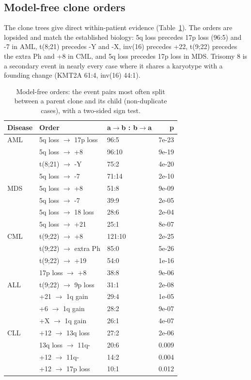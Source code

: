 \documentclass[conference]{IEEEtran}
\begin{document}
\subsection{Model-free clone orders}
The clone trees give direct within-patient evidence (Table~\ref{tab:cloneorders}). The orders are lopsided and match the established biology: 5q loss precedes 17p loss (96:5) and -7 in AML, t(8;21) precedes -Y and -X, inv(16) precedes +22, t(9;22) precedes the extra Ph and +8 in CML, and 5q loss precedes 17p loss in MDS. Trisomy 8 is a secondary event in nearly every case where it shares a karyotype with a founding change (KMT2A 61:4, inv(16) 44:1).

\begin{table}[!t]
\centering
\caption{Model-free orders: the event pairs most often split between a parent clone and its child (non-duplicate cases), with a two-sided sign test.}
\label{tab:cloneorders}
\footnotesize
\setlength{\tabcolsep}{3pt}
\begin{tabular}{lllr}
\toprule
\textbf{Disease} & \textbf{Order} & \textbf{a$\rightarrow$b : b$\rightarrow$a} & \textbf{p} \\
\midrule
AML & 5q loss $\rightarrow$ 17p loss & 96:5 & 7e-23 \\
 & 5q loss $\rightarrow$ +8 & 96:10 & 9e-19 \\
 & t(8;21) $\rightarrow$ -Y & 75:2 & 4e-20 \\
 & 5q loss $\rightarrow$ -7 & 71:14 & 2e-10 \\
MDS & 5q loss $\rightarrow$ +8 & 51:8 & 9e-09 \\
 & 5q loss $\rightarrow$ -7 & 39:9 & 2e-05 \\
 & 5q loss $\rightarrow$ 18 loss & 28:6 & 2e-04 \\
 & 5q loss $\rightarrow$ +21 & 25:1 & 8e-07 \\
CML & t(9;22) $\rightarrow$ +8 & 121:10 & 2e-25 \\
 & t(9;22) $\rightarrow$ extra Ph & 85:0 & 5e-26 \\
 & t(9;22) $\rightarrow$ +19 & 54:0 & 1e-16 \\
 & 17p loss $\rightarrow$ +8 & 38:8 & 9e-06 \\
ALL & t(9;22) $\rightarrow$ 9p loss & 31:1 & 2e-08 \\
 & +21 $\rightarrow$ 1q gain & 29:4 & 1e-05 \\
 & +6 $\rightarrow$ 1q gain & 28:2 & 9e-07 \\
 & +X $\rightarrow$ 1q gain & 26:1 & 4e-07 \\
CLL & +12 $\rightarrow$ 13q loss & 27:2 & 2e-06 \\
 & 13q loss $\rightarrow$ 11q- & 20:6 & 0.009 \\
 & +12 $\rightarrow$ 11q- & 14:2 & 0.004 \\
 & +12 $\rightarrow$ 17p loss & 10:1 & 0.012 \\
\bottomrule
\end{tabular}
\end{table}
\end{document}
